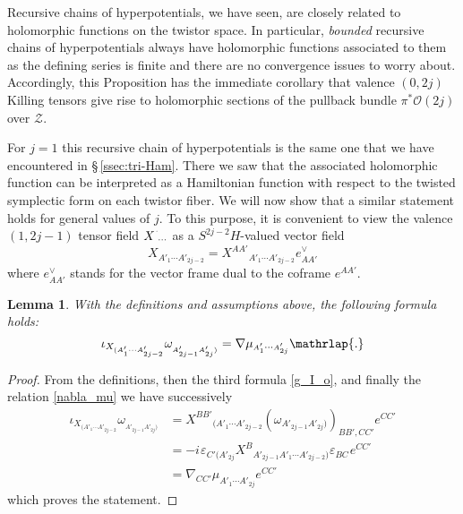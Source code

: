 \documentclass[11pt]{amsart}
\newtheorem{lemma}[theorem]{Lemma}
\theoremstyle{remark}
\theoremstyle{remark}
\theoremstyle{definition}
\theoremstyle{definition}
\theoremstyle{definition}
\newcommand{\0}{{\scriptstyle 0'}} %
\newcommand{\1}{{\scriptstyle 1'}}
\newcommand{\A}{{\scriptscriptstyle A}} %
\newcommand{\B}{{\scriptscriptstyle B}}
\newcommand{\C}{{\scriptscriptstyle C}}
\newcommand{\pt}{\hspace{1pt}} %
\newcommand{\hp}{\hspace{0.5pt}} %
\begin{document}
Recursive chains of hyperpotentials, we have seen, are closely related to holomorphic functions on the twistor space. In particular, \textit{bounded} recursive chains of hyperpotentials always have holomorphic functions associated to them as the defining series is finite and there are no convergence issues to worry about. Accordingly, this Proposition has the immediate corollary that valence $(0,2j)$ Killing tensors give rise to holomorphic sections of the pullback bundle $\pi^*\mathcal{O}(2j)$ over $\mathcal{Z}$.

For $j=1$ this recursive chain of hyperpotentials is the same one that we have encountered in \S\,\ref{ssec:tri-Ham}. There we saw that the associated holomorphic function can be interpreted as a Hamiltonian function with respect to the twisted symplectic form on each twistor fiber. We will now show that a similar statement holds for general values of $j$. To this purpose, it is convenient to view the valence $(1,2j-1)$ tensor field $X^{\hp ^{.}}{}_{\!\cdots}$ as a $S^{2j-2}H$-valued vector field
\begin{equation}
X_{\A'_1\cdots\A'_{2j-2}} = X^{\A\A'}{}_{\A'_1\cdots\A'_{2j-2}} e^{\vee}_{\A\A'} 
\end{equation}
where $e^{\vee}_{\A\A'}$ stands for the vector frame dual to the coframe $e^{\A\A'}$.  

\begin{lemma} \label{poc}
With the definitions and assumptions above, the following formula holds:
\begin{equation} \label{i_X_o_symm}
\iota_{X_{(\A'_1\cdots\A'_{2j-2}}} \omega_{_{\A'_{2j-1}\A'_{2j})}} = \nabla \mu_{\A'_1 \cdots \A'_{2j}} \mathrlap{.}
\end{equation}
\end{lemma}

\begin{proof}

From the definitions, then the third formula \eqref{g_I_o}, and finally the relation \eqref{nabla_mu} we have successively
{\allowdisplaybreaks
\begin{align}
\iota_{X_{(\A'_1\cdots\A'_{2j-2}}} \omega_{_{\A'_{2j-1}\A'_{2j})}} & = X^{\B\B'}{}_{(\A'_1\cdots\A'_{2j-2}} (\omega_{\A'_{2j-1}\A'_{2j})})_{\B\B',\C\C'} e^{\C\C'} \\[1pt]
& = - i \pt \varepsilon_{\C'(\A'_{2j}} X^{\B}{}_{\A'_{2j-1}\A'_1\cdots\A'_{2j-2})} \varepsilon_{\B\C} \pt e^{\C\C'} \nonumber \\[3pt]
& = \nabla_{\C\C'} \mu_{\A'_1 \cdots \A'_{2j}} e^{\C\C'} \nonumber
\end{align}
}which proves the statement.
\end{proof}
\end{document}

